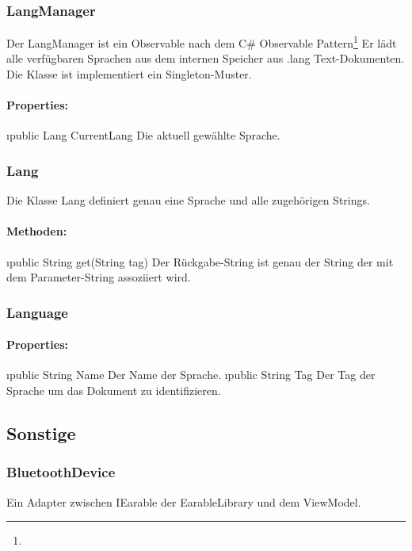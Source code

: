 \documentclass[../entwurf.tex]{subfiles}
\begin{document}
			\subsubsection{LangManager}
				Der LangManager ist ein Observable nach dem 
				C\# Observable Pattern\footnote{}
				Er lädt alle verfügbaren Sprachen aus dem internen Speicher aus .lang Text-Dokumenten.
				Die Klasse ist implementiert ein Singleton-Muster.
				\paragraph{Properties:}
					\begin{itemize}
						\i{public Lang CurrentLang} Die aktuell gewählte Sprache.
					\end{itemize}
			\subsubsection{Lang}
				Die Klasse Lang definiert genau eine Sprache und alle zugehörigen Strings. 
				\paragraph{Methoden:}
					\begin{itemize}
						\i{public String get(String tag)} Der Rückgabe-String ist genau der String der mit dem Parameter-String assoziiert wird.
					\end{itemize}
			\subsubsection{Language}
				\paragraph{Properties:}
					\begin{itemize}
						\i{public String Name} Der Name der Sprache.
						\i{public String Tag} Der Tag der Sprache um das Dokument zu identifizieren.
					\end{itemize}
		\subsection{Sonstige}
			\subsubsection{BluetoothDevice}
				Ein Adapter zwischen IEarable der EarableLibrary und dem ViewModel.
\end{document}
